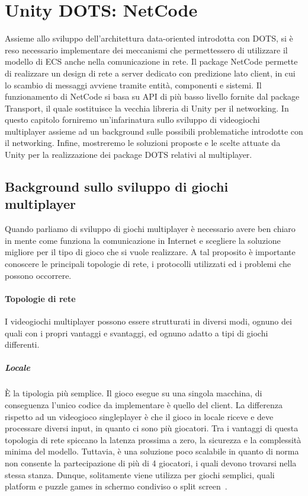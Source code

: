\chapter{Unity DOTS: NetCode}
\label{cap:netcode}
Assieme allo sviluppo dell'architettura data-oriented introdotta con DOTS, si è reso necessario implementare dei meccanismi che permettessero di utilizzare il modello di ECS anche nella comunicazione in rete.
Il package NetCode permette di realizzare un design di rete a server dedicato con predizione lato client, in cui lo scambio di messaggi avviene tramite entità, componenti e sistemi. Il funzionamento di NetCode si basa su API di più basso livello fornite dal package Transport, il quale sostituisce la vecchia libreria di Unity per il networking.
In questo capitolo forniremo un'infarinatura sullo sviluppo di videogiochi multiplayer assieme ad un background sulle possibili problematiche introdotte con il networking. Infine, mostreremo le soluzioni proposte e le scelte attuate da Unity per la realizzazione dei package DOTS relativi al multiplayer.

\section{Background sullo sviluppo di giochi multiplayer}
Quando parliamo di sviluppo di giochi multiplayer è necessario avere ben chiaro in mente come funziona la comunicazione in Internet e scegliere la soluzione migliore per il tipo di gioco che si vuole realizzare. A tal proposito è importante conoscere le principali topologie di rete, i protocolli utilizzati ed i problemi che possono occorrere.

\subsubsection{Topologie di rete}
I videogiochi multiplayer possono essere strutturati in diversi modi, ognuno dei quali con i propri vantaggi e svantaggi, ed ognuno adatto a tipi di giochi differenti.

\paragraph{Locale}
È la tipologia più semplice. Il gioco esegue su una singola macchina, di conseguenza l'unico codice da implementare è quello del client. La differenza rispetto ad un videogioco singleplayer è che il gioco in locale riceve e deve processare diversi input, in quanto ci sono più giocatori. Tra i vantaggi di questa topologia di rete spiccano la latenza prossima a zero, la sicurezza e la complessità minima del modello. Tuttavia, è una soluzione poco scalabile in quanto di norma non consente la partecipazione di più di 4 giocatori, i quali devono trovarsi nella stessa stanza. Dunque, solitamente viene utilizza per giochi semplici, quali platform e puzzle games in schermo condiviso o split screen~\cite{youtube:realtime-multiplayer}.

